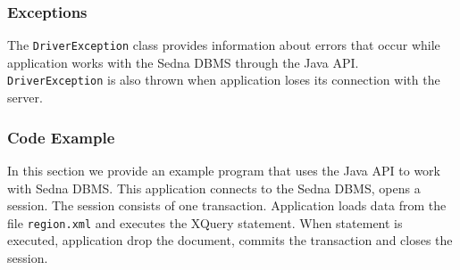 \documentclass[a4paper,12pt]{article}
\begin{document}
\subsubsection{Exceptions}

The \verb!DriverException! class provides information about errors that occur
while application works with the Sedna DBMS through the Java API.
\verb!DriverException! is also thrown when application loses its connection with
the server.


\subsubsection{Code Example}

In this section we provide an example program that uses the Java API to work
with Sedna DBMS. This application connects to the Sedna DBMS, opens a session.
The session consists of one transaction. Application loads data from the file
\verb!region.xml! and executes the XQuery statement. When statement is executed,
application drop the document, commits the transaction and closes the session.
 
\end{document}
